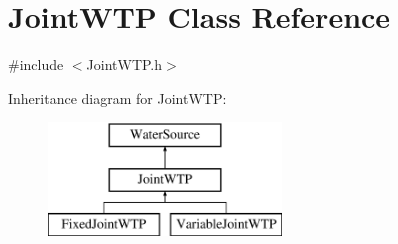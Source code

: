 \hypertarget{classJointWTP}{}\section{Joint\+W\+TP Class Reference}
\label{classJointWTP}


{\ttfamily \#include $<$Joint\+W\+T\+P.\+h$>$}

Inheritance diagram for Joint\+W\+TP\+:\begin{figure}[H]
\begin{center}
\leavevmode
\includegraphics[height=3.000000cm]{classJointWTP}
\end{center}
\end{figure}
